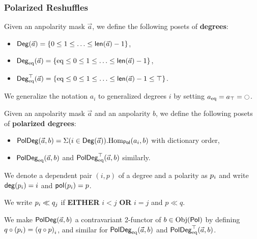 \documentclass[a4paper]{memoir}
\begin{document}
\subsubsection{Polarized Reshuffles}
\begin{definition}
	Given an anpolarity mask $\vec a$, we define the following posets of \textbf{degrees}:
	\begin{itemize}
		\item $\Deg(\vec a) = \accol{0 \leq 1 \leq \ldots \leq \lenpol{\vec a} - 1}$,
		\item $\Degeq(\vec a) = \accol{\eqtydeg \leq 0 \leq 1 \leq \ldots \leq \lenpol{\vec a} - 1}$,
		\item $\Degeqtop(\vec a) = \accol{\eqtydeg \leq 0 \leq 1 \leq \ldots \leq \lenpol{\vec a} - 1 \leq \top}$.
	\end{itemize}
	We generalize the notation $a_i$ to generalized degrees $i$ by setting $a_\eqtydeg = a_\top = \npolar$.
\end{definition}
\begin{definition}
	Given an anpolarity mask $\vec a$ and an anpolarity $b$, we define the following posets of \textbf{polarized degrees}:
	\begin{itemize}
		\item $\poldeg(\vec a, b) = \Sigma(i \in \Deg(\vec a)).\Hom_\polsymbol(a_i, b)$ with dictionary order,
		\item $\poldegeq(\vec a, b)$ and $\poldegeqtop(\vec a, b)$ similarly.
	\end{itemize}
	We denote a dependent pair $(i, p)$ of a degree and a polarity as $\dpol i p$ and write $\getdeg(\dpol i p) = i$ and $\getpol(\dpol i p) = p$.
	
	We write $\dpol i p \ll \dpol j q$ if \textbf{EITHER} $i < j$ \textbf{OR} $i = j$ and $p \ll q$.
	
	We make $\poldeg(\vec a, b)$ a contravariant 2-functor of $b \in \Obj(\polsymbol)$ by defining $q \circ (\dpol i p) = \dpol i {(q \circ p)}$, and similar for $\poldegeq(\vec a, b)$ and $\poldegeqtop(\vec a, b)$.
\end{definition}
\end{document}
